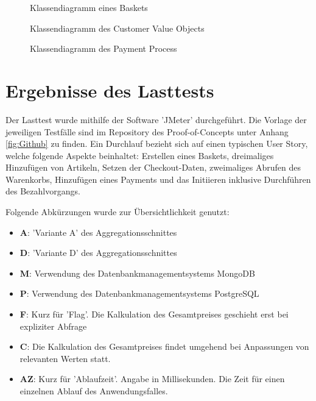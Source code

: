\begin{anhang}
\vspace{1cm}
\begin{figure}[htbp]
	\centering
	
	\caption{Klassendiagramm eines Baskets}
	\label{fig:VO-Basket}
\end{figure}

\begin{figure}[htbp]
	\centering
	
	\caption{Klassendiagramm des Customer Value Objects}
	\label{fig:VO-Customer}
\end{figure}

\begin{figure}[htbp]
	\centering
	
	\caption{Klassendiagramm des Payment Process}
	\label{fig:VO-Payment}
\end{figure}

\section{Ergebnisse des Lasttests} \label{label:Lasttests}

Der Lasttest wurde mithilfe der Software 'JMeter' durchgeführt. Die Vorlage der jeweiligen Testfälle sind im Repository des Proof-of-Concepts unter Anhang \ref{fig:Github} zu finden. Ein Durchlauf bezieht sich auf einen typischen User Story, welche folgende Aspekte beinhaltet: Erstellen eines Baskets, dreimaliges Hinzufügen von Artikeln, Setzen der Checkout-Daten, zweimaliges Abrufen des Warenkorbs, Hinzufügen eines Payments und das Initiieren inklusive Durchführen des Bezahlvorgangs. 

Folgende Abkürzungen wurde zur Übersichtlichkeit genutzt:
\begin{itemize}[noitemsep,nolistsep]
	\item \textbf{A}: 'Variante A' des Aggregationsschnittes
	\item \textbf{D}: 'Variante D' des Aggregationsschnittes
	\item \textbf{M}: Verwendung des Datenbankmanagementsystems MongoDB
	\item \textbf{P}: Verwendung des Datenbankmanagementsystems PostgreSQL
	\item \textbf{F}: Kurz für 'Flag'. Die Kalkulation des Gesamtpreises geschieht erst bei expliziter Abfrage
	\item \textbf{C}: Die Kalkulation des Gesamtpreises findet umgehend bei Anpassungen von relevanten Werten statt.
	\item \textbf{AZ}: Kurz für 'Ablaufzeit'. Angabe in Millisekunden. Die Zeit für einen einzelnen Ablauf des Anwendungsfalles. 
\end{itemize}



\end{anhang}
